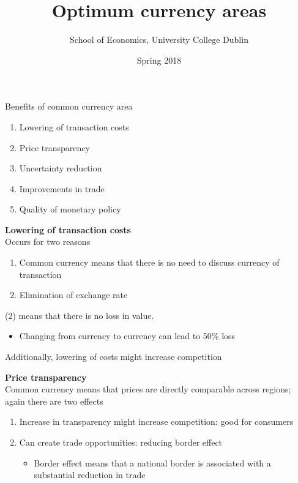 \documentclass{beamer}
\title{Optimum currency areas}
\author{School of Economics, University College Dublin}
\date{Spring 2018}
\begin{document}
\begin{frame}
 \titlepage
\end{frame}

\begin{frame}
  Benefits of common currency area
  \begin{enumerate}
    \item Lowering of transaction costs
    \item Price transparency
    \item Uncertainty reduction
    \item Improvements in trade
    \item Quality of monetary policy
  \end{enumerate}
\end{frame}

\begin{frame}
  \textbf{Lowering of transaction costs}\\
  Occurs for two reasons
  \begin{enumerate}
    \item Common currency means that there is no need to discuss currency of transaction
    \item Elimination of exchange rate
  \end{enumerate}
  (2) means that there is no loss in value. 
  \begin{itemize}
    \item Changing from currency to currency can lead to 50\% loss
  \end{itemize}
  \medskip
  Additionally, lowering of costs might increase competition  
\end{frame}

\begin{frame}
  \textbf{Price transparency}\\
  Common currency means that prices are directly comparable across regions; again there are two effects
  \begin{enumerate}
    \item Increase in transparency might increase competition: good for consumers
    \item Can create trade opportunities: reducing border effect
    \begin{itemize}
      \item Border effect means that a national border is associated with a substantial reduction in trade
    \end{itemize}
  \end{enumerate}
\end{frame}
\end{document}
